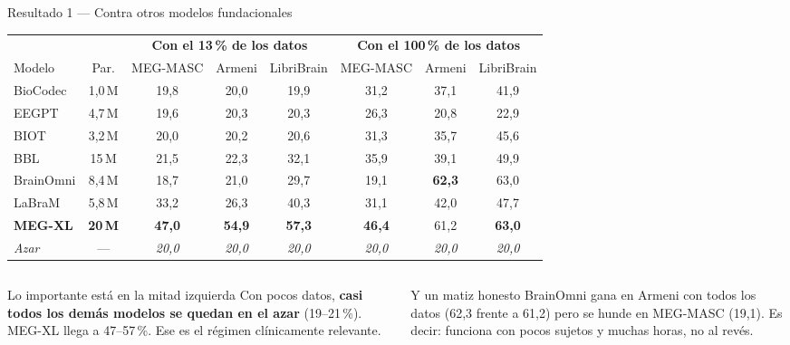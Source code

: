 \documentclass[aspectratio=169,10pt]{beamer}
\newcommand{\term}[1]{\textbf{\color{deepgreen}#1}}
\begin{document}
\begin{frame}[c]{Resultado 1 --- Contra otros modelos fundacionales}
  \centering
  \scriptsize
  \renewcommand{\arraystretch}{1.15}
  \setlength{\tabcolsep}{5pt}
  \begin{tabular}{lccccccc}
    \toprule
    & & \multicolumn{3}{c}{\textbf{Con el 13\,\% de los datos}} & \multicolumn{3}{c}{\textbf{Con el 100\,\% de los datos}} \\
    \cmidrule(lr){3-5}\cmidrule(lr){6-8}
    Modelo & Par. & MEG-MASC & Armeni & LibriBrain & MEG-MASC & Armeni & LibriBrain \\
    \midrule
    BioCodec   & 1,0\,M & 19,8 & 20,0 & 19,9 & 31,2 & 37,1 & 41,9 \\
    EEGPT      & 4,7\,M & 19,6 & 20,3 & 20,3 & 26,3 & 20,8 & 22,9 \\
    BIOT       & 3,2\,M & 20,0 & 20,2 & 20,6 & 31,3 & 35,7 & 45,6 \\
    BBL        & 15\,M  & 21,5 & 22,3 & 32,1 & 35,9 & 39,1 & 49,9 \\
    BrainOmni  & 8,4\,M & 18,7 & 21,0 & 29,7 & 19,1 & \textbf{62,3} & 63,0 \\
    LaBraM     & 5,8\,M & 33,2 & 26,3 & 40,3 & 31,1 & 42,0 & 47,7 \\
    \midrule
    \textbf{MEG-XL} & \textbf{20\,M} & \textbf{47,0} & \textbf{54,9} & \textbf{57,3} & \textbf{46,4} & 61,2 & \textbf{63,0} \\
    \midrule
    \emph{Azar} & --- & \emph{20,0} & \emph{20,0} & \emph{20,0} & \emph{20,0} & \emph{20,0} & \emph{20,0} \\
    \bottomrule
  \end{tabular}
  \vspace{2mm}
  \begin{columns}[t,totalwidth=\linewidth]
    \begin{column}{0.48\linewidth}
      \begin{alertblock}{Lo importante está en la mitad izquierda}
        \footnotesize Con pocos datos, \term{casi todos los demás modelos se quedan en el azar} (19--21\,\%). MEG-XL llega a 47--57\,\%. Ese es el régimen clínicamente relevante.
      \end{alertblock}
    \end{column}
    \begin{column}{0.48\linewidth}
      \begin{block}{Y un matiz honesto}
        \footnotesize BrainOmni gana en Armeni con todos los datos (62,3 frente a 61,2) pero se hunde en MEG-MASC (19,1). Es decir: funciona con pocos sujetos y muchas horas, no al revés.
      \end{block}
    \end{column}
  \end{columns}
\end{frame}
\end{document}
